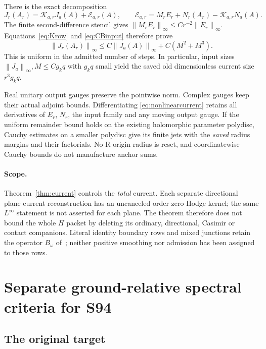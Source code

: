 \documentclass[11pt,letterpaper]{article}
\numberwithin{equation}{section}
\theoremstyle{definition}\newtheorem{definition}[theorem]{Definition}
\theoremstyle{remark}\newtheorem{remark}[theorem]{Remark}
\newcommand{\norm}[1]{\left\lVert #1\right\rVert}
\newcommand{\Kern}{\mathcal K}
\begin{document}
There is the exact decomposition
\begin{equation}
 J_r(A_r)=\Kern_{a,r}J_a(A)+\mathcal E_{a,r}(A),\qquad
 \mathcal E_{a,r}=M_rE_r+N_r(A_r)-\Kern_{a,r}N_a(A).
 \label{eq:nonlinearcurrent}
\end{equation}
The finite second-difference stencil gives $\norm{M_rE_r}_\infty\le Cr^{-2}\norm{E_r}_\infty$. Equations~\eqref{eq:Krow} and \eqref{eq:CBinput} therefore prove
\begin{equation}
 \norm{J_r(A_r)}_\infty
 \le C\norm{J_a(A)}_\infty+C(M^2+M^3).
 \label{eq:nonlinearbound}
\end{equation}
This is uniform in the admitted number of steps. In particular, input sizes $\norm{J_a}_\infty,M\le Cg_kq$ with $g_kq$ small yield the saved old dimensionless current size $r^3g_kq$.

Real unitary output gauges preserve the pointwise norm. Complex gauges keep their actual adjoint bounds. Differentiating \eqref{eq:nonlinearcurrent} retains all derivatives of $E_r$, $N_r$, the input family and any moving output gauge. If the uniform remainder bound holds on the existing holomorphic parameter polydisc, Cauchy estimates on a smaller polydisc give its finite jets with the \emph{saved} radius margins and their factorials. No R-origin radius is reset, and coordinatewise Cauchy bounds do not manufacture anchor sums.

\paragraph{Scope.}
Theorem~\ref{thm:current} controls the \emph{total} current. Each separate directional plane-current reconstruction has an uncanceled order-zero Hodge kernel; the same $L^\infty$ statement is not asserted for each plane. The theorem therefore does not bound the whole $H$ packet by deleting its ordinary, directional, Casimir or contact companions. Literal identity boundary rows and mixed junctions retain the operator $B_\omega$ of~\cite[\S2.3]{UA}; neither positive smoothing nor admission has been assigned to those rows.

\section{Separate ground-relative spectral criteria for S94}
\label{sec:spectral}

\subsection{The original target}
\end{document}
